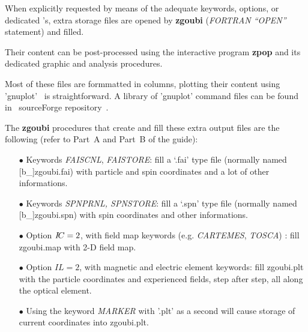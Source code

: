 When explicitly requested by means of the adequate keywords,  options, or dedicated 
\LABEL's, extra storage files are opened by \textbf{zgoubi} 
(\textsl{FORTRAN ``OPEN''} statement) and filled. 

\medskip

\noindent Their content can be    post-processed using the interactive program \textbf{zpop} and its dedicated graphic 
and analysis procedures. 

\bigskip

\noindent Most of these files are formmatted in columns, plotting their content using 
'gnuplot'~\cite{gnuplot} is 
straightforward. A library of 'gnuplot' command files can be found in \zgoubi\ sourceForge repository~\cite{SFZ}. 

\bigskip

\noindent The \textbf{zgoubi} procedures that create and fill these extra output 
files are the following (refer to Part~A and Part~B of the 
guide):

\begin{itemize}
  \item[$\bullet$] Keywords \textsl{FAISCNL}, \textsl{FAISTORE}:
   fill a `.fai' type file (normally 
  named [b\_]zgoubi.fai) with particle and spin 
coordinates and a lot of other informations. 

  \item[$\bullet$] Keywords \textsl{SPNPRNL, SPNSTORE}:
   fill  a `.spn' type file (normally 
  named [b\_]zgoubi.spn)  with spin 
coordinates and other informations. 

 \item[$\bullet$] Option $I\!C=2$, with field map keywords (e.g. 
 \textsl{CARTEMES}, 
\textsl{TOSCA}) : fill  zgoubi.map  with 2-D field map. 

  \item[$\bullet$] Option $IL=2$, with magnetic and electric element 
keywords: fill zgoubi.plt with the particle coordinates and 
experienced fields, step after step, all along the optical 
element.

  \item[$\bullet$] Using the keyword \textsl{MARKER}  
with '.plt' as a second \LABEL {} will cause storage of current coordinates into zgoubi.plt. 


\end{itemize}

